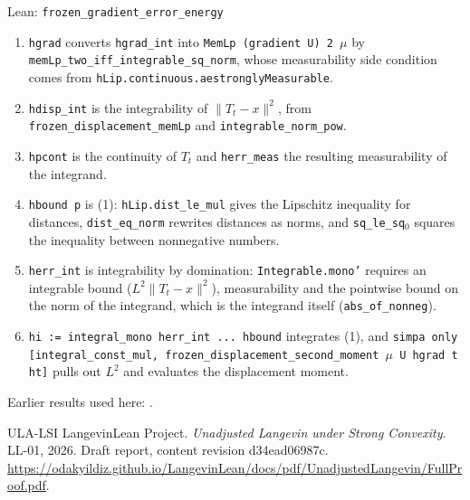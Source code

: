 \documentclass[11pt,a4paper]{article}
\begin{document}
\begin{leanbox}{Lean: \texttt{frozen\_\allowbreak{}gradient\_\allowbreak{}error\_\allowbreak{}energy}}
\begin{enumerate}


\item \texttt{hgrad} converts \texttt{hgrad\_\allowbreak{}int} into \texttt{Mem\allowbreak{}Lp (gradient U) 2 \ensuremath{\mu}} by \texttt{mem\allowbreak{}Lp\_\allowbreak{}two\_\allowbreak{}iff\_\allowbreak{}integrable\_\allowbreak{}sq\_\allowbreak{}norm}, whose measurability side condition comes from \texttt{h\allowbreak{}Lip.\allowbreak{}continuous.\allowbreak{}aestrongly\allowbreak{}Measurable}.

\item \texttt{hdisp\_\allowbreak{}int} is the integrability of \(\|T_t-x\|^2\), from \texttt{frozen\_\allowbreak{}displacement\_\allowbreak{}mem\allowbreak{}Lp} and \texttt{integrable\_\allowbreak{}norm\_\allowbreak{}pow}.

\item \texttt{hpcont} is the continuity of \(T_t\) and \texttt{herr\_\allowbreak{}meas} the resulting measurability of the integrand.

\item \texttt{hbound p} is (1): \texttt{h\allowbreak{}Lip.\allowbreak{}dist\_\allowbreak{}le\_\allowbreak{}mul} gives the Lipschitz inequality for distances, \texttt{dist\_\allowbreak{}eq\_\allowbreak{}norm} rewrites distances as norms, and \texttt{sq\_\allowbreak{}le\_\allowbreak{}sq\ensuremath{{}_{0}}} squares the inequality between nonnegative numbers.

\item \texttt{herr\_\allowbreak{}int} is integrability by domination: \texttt{Integrable.\allowbreak{}mono'} requires an integrable bound (\(L^2\|T_t-x\|^2\)), measurability and the pointwise bound on the norm of the integrand, which is the integrand itself (\texttt{abs\_\allowbreak{}of\_\allowbreak{}nonneg}).

\item \texttt{hi := integral\_\allowbreak{}mono herr\_\allowbreak{}int .\allowbreak{}.\allowbreak{}.\allowbreak{} hbound} integrates (1), and \texttt{simpa only [integral\_\allowbreak{}const\_\allowbreak{}mul, frozen\_\allowbreak{}displacement\_\allowbreak{}second\_\allowbreak{}moment \ensuremath{\mu} U hgrad t ht]} pulls out \(L^2\) and evaluates the displacement moment.

\end{enumerate}
\end{leanbox}


Earlier results used here: \cite[Section~3.34.1]{LangevinLean2026ULASC}.

\begin{thebibliography}{ULA-LSI}
LangevinLean Project. \emph{Unadjusted Langevin under Strong Convexity}. LL-01, 2026. Draft report, content revision d34ead06987c. \url{https://odakyildiz.github.io/LangevinLean/docs/pdf/UnadjustedLangevin/FullProof.pdf}.
\end{thebibliography}
\end{document}
